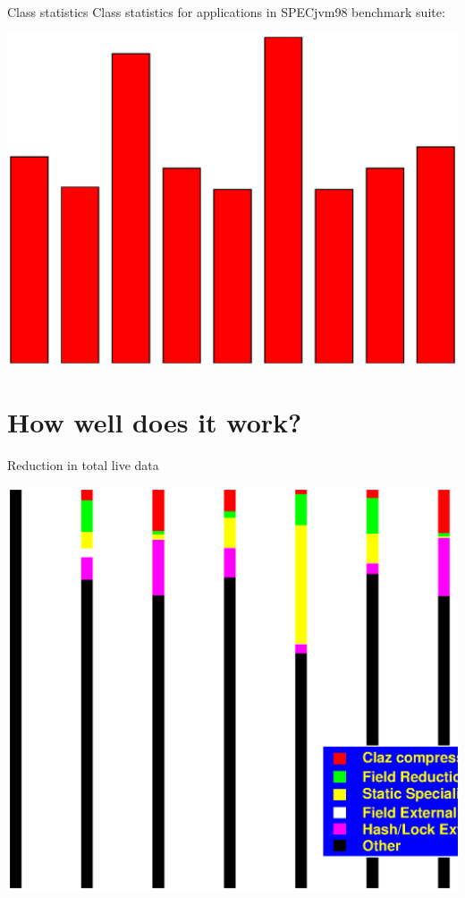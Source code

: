 \documentclass[%
pdf,
colorBG,
slideColor,
nototal,
oqe
]{prosper}
\begin{document}
\begin{slide}{Class statistics}
Class statistics for applications in SPECjvm98 benchmark suite:
\begin{center}
\includegraphics[scale=0.5]{Figures/specclaz.eps}
\end{center}
\end{slide}

\part{How well does it work?}

\begin{slide}{Reduction in total live data}
\begin{center}
\includegraphics[scale=0.45]{Figures/oopsla-ttllive-color.eps}
\end{center}
\end{slide}
\end{document}
